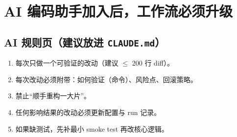 \chapter{AI 编码助手加入后，工作流必须升级}
\label{ch:ai_workflow}
\section{AI 规则页（建议放进 \texttt{CLAUDE.md}）}
\begin{enumerate}
  \item 每次只做一个可验证的改动（建议 $\le$ 200 行 diff）。
  \item 每次改动必须附带：如何验证（命令）、风险点、回滚策略。
  \item 禁止“顺手重构一大片”。
  \item 任何影响结果的改动必须更新配置与 run 记录。
  \item 如果缺测试，先补最小 smoke test 再改核心逻辑。
\end{enumerate}